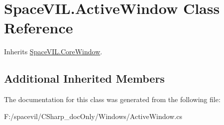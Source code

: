 \hypertarget{class_space_v_i_l_1_1_active_window}{}\section{Space\+V\+I\+L.\+Active\+Window Class Reference}
\label{class_space_v_i_l_1_1_active_window}


Inherits \mbox{\hyperlink{class_space_v_i_l_1_1_core_window}{Space\+V\+I\+L.\+Core\+Window}}.

\subsection*{Additional Inherited Members}


The documentation for this class was generated from the following file\+:\begin{DoxyCompactItemize}
\item 
F\+:/spacevil/\+C\+Sharp\+\_\+doc\+Only/\+Windows/Active\+Window.\+cs\end{DoxyCompactItemize}
